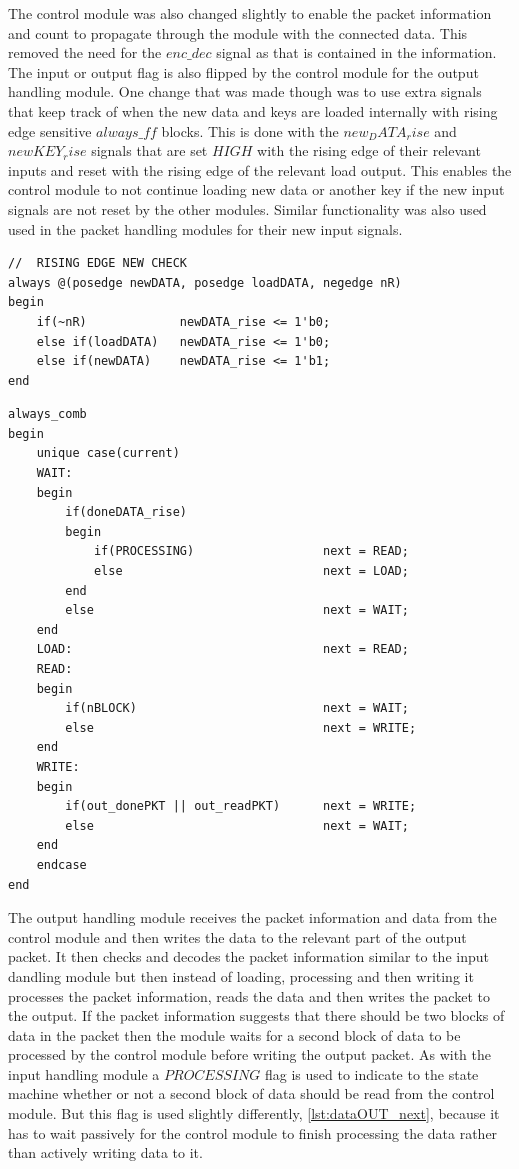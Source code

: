 \documentclass[12pt,twoside,a4paper]{report}
\begin{document}
	The control module was also changed slightly to enable the packet information and count to propagate through the module with the connected data. This removed the need for the $enc\_dec$ signal as that is contained in the information. The input or output flag is also flipped by the control module for the output handling module. One change that was made though was to use extra signals that keep track of when the new data and keys are loaded internally with rising edge sensitive $always\_ff$ blocks. This is done with the $new_DATA_rise$ and $newKEY_rise$ signals that are set $HIGH$ with the rising edge of their relevant inputs and reset with the rising edge of the relevant load output. This enables the control module to not continue loading new data or another key if the new input signals are not reset by the other modules. Similar functionality was also used used in the packet handling modules for their new input signals.

 	\begin{minipage}{\linewidth}
	\begin{lstlisting}[label={lst:new_rise},caption={The $always\_ff$ blocks used for risnig edge new data checks},style=SVStyle]
//	RISING EDGE NEW CHECK
always @(posedge newDATA, posedge loadDATA, negedge nR)
begin
	if(~nR)				newDATA_rise <= 1'b0;
	else if(loadDATA)	newDATA_rise <= 1'b0;
	else if(newDATA)	newDATA_rise <= 1'b1;
end
	\end{lstlisting}
	\end{minipage}

 	\begin{minipage}{\linewidth}
	\begin{lstlisting}[label={lst:dataOUT_next},caption={The next state logic for the output data handling module.},style=SVStyle]
always_comb
begin
	unique case(current)
	WAIT:
	begin
		if(doneDATA_rise)
		begin
			if(PROCESSING)					next = READ;
			else							next = LOAD;
		end
		else								next = WAIT;
	end
	LOAD:									next = READ;
	READ:
	begin
		if(nBLOCK)							next = WAIT;
		else								next = WRITE;		
	end
	WRITE:
	begin
		if(out_donePKT || out_readPKT)		next = WRITE;
		else								next = WAIT;
	end
	endcase
end
	\end{lstlisting}
	\end{minipage}
	
	The output handling module receives the packet information and data from the control module and then writes the data to the relevant part of the output packet. It then checks and decodes the packet information similar to the input dandling module but then instead of loading, processing and then writing it processes the packet information, reads the data and then writes the packet to the output. If the packet information suggests that there should be two blocks of data in the packet then the module waits for a second block of data to be processed by the control module before writing the output packet. As with the input handling module a $PROCESSING$ flag is used to indicate to the state machine whether or not a second block of data should be read from the control module. But this flag is used slightly differently, \autoref{lst:dataOUT_next}, because it has to wait passively for the control module to finish processing the data rather than actively writing data to it.
\end{document}
